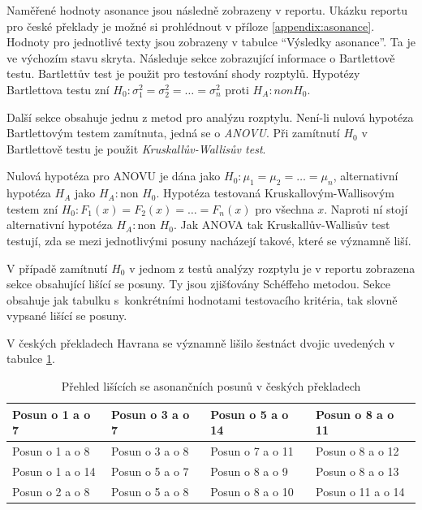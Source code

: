 \documentclass[dp.tex]{subfiles}
\begin{document}
Naměřené hodnoty asonance jsou následně zobrazeny v reportu. Ukázku reportu pro české překlady je možné si prohlédnout v příloze \ref{appendix:asonance}. Hodnoty pro jednotlivé texty jsou zobrazeny v tabulce \enquote{Výsledky asonance}. Ta je ve výchozím stavu skryta. Následuje sekce zobrazující informace o Bartlettově testu. Bartlettův test je použit pro testování shody rozptylů. Hypotézy Bartlettova testu zní $H_0: \sigma^2_1 = \sigma^2_2 = \dots = \sigma^2_n$ proti $H_A: non H_0$.

Další sekce obsahuje jednu z metod pro analýzu rozptylu. Není-li nulová hypotéza Bartlettovým testem zamítnuta, jedná se o \textit{ANOVU}. Při zamítnutí $H_0$ v Bartlettově testu je použit \textit{Kruskallův-Wallisův test}.

Nulová hypotéza pro ANOVU je dána jako $H_0: \mu_1 = \mu_2 = \dots = \mu_n$, alternativní hypotéza $H_A$ jako $H_A:  \mbox{non } H_0$. Hypotéza testovaná Kruskallovým-Wallisovým testem zní $H_0: F_1(x) = F_2(x) = \dots = F_n(x)$ pro všechna $x$. Naproti ní stojí alternativní hypotéza $H_A: \mbox{non } H_0$. Jak ANOVA tak Kruskallův-Wallisův test testují, zda se mezi jednotlivými posuny nacházejí takové, které se významně liší.

V případě zamítnutí $H_0$ v jednom z testů analýzy rozptylu je v reportu zobrazena sekce obsahující lišící se posuny. Ty jsou zjišťovány Schéffeho metodou. Sekce obsahuje jak tabulku s~konkrétními hodnotami testovacího kritéria, tak slovně vypsané lišící se posuny.

V českých překladech Havrana se významně lišilo šestnáct dvojic uvedených v tabulce \ref{tab:asonance-lisici-se}.
\begin {table}[H]
	\caption {Přehled lišících se asonančních posunů v českých překladech} 
	\label{tab:asonance-lisici-se} 

	\begin{center}
		\begin{tabular}{|l|l|l|l|}
		\hline Posun o 1 a o 7   & Posun o 3 a o 7 & Posun o 5 a o 14 & Posun o 8 a o 11  \\ 
		\hline Posun o 1 a o 8   & Posun o 3 a o 8 & Posun o 7 a o 11 & Posun o 8 a o 12  \\ 
		\hline Posun o 1 a o 14  & Posun o 5 a o 7 & Posun o 8 a o 9  & Posun o 8 a o 13  \\ 
		\hline Posun o 2 a o 8   & Posun o 5 a o 8 & Posun o 8 a o 10 & Posun o 11 a o 14 \\ 
		\hline 
		\end{tabular} 
	\end{center}
\end{table}
\end{document}
